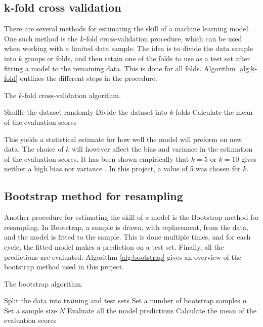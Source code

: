 \subsection{k-fold cross validation}
There are several methods for estimating the skill of a machine learning model. One such method is the $k$-fold cross-validation procedure, which can be used when working with a limited data sample. The idea is to divide the data sample into $k$ groups or folds, and then retain one of the folds to use as a test set after fitting a model to the remaining data. This is done for all folds. Algorithm \ref{alg:k-fold} outlines the different steps in the procedure.

\begin{algorithm}[htbp]\caption{The $k$-fold cross-validation algorithm.}\label{alg:k-fold}
	\SetAlgoLined
	\BlankLine
	\BlankLine
	Shuffle the dataset randomly\;
	Divide the dataset into $k$ folds\;
	Calculate the mean of the evaluation scores\;
	\BlankLine
	\BlankLine
\end{algorithm}

This yields a statistical estimate for how well the model will preform on new data. The choice of $k$ will however affect the bias and variance in the estimation of the evaluation scores. It has been shown empirically that $k=5$ or $k=10$ gives neither a high bias nor variance \citep{james2013introduction}. In this project, a value of 5 was chosen for $k$.

\subsection{Bootstrap method for resampling}
Another procedure for estimating the skill of a model is the Bootstrap method for resampling. In Bootstrap, a sample is drawn, with replacement, from the data, and the model is fitted to the sample. This is done multiple times, and for each cycle, the fitted model makes a prediction on a test set. Finally, all the predictions are evaluated. Algorithm \ref{alg:bootstrap} gives an overview of the bootstrap method used in this project.
\begin{algorithm}[htbp]\caption{The bootstrap algorithm.}\label{alg:bootstrap}
	\SetAlgoLined
	\BlankLine
	\BlankLine
	Split the data into training and test sets\;
	Set a number of bootstrap samples $n$\;
	Set a sample size $N$\;
	Evaluate all the model predictions\;
	Calculate the mean of the evaluation scores\;
	\BlankLine
	\BlankLine
\end{algorithm}


